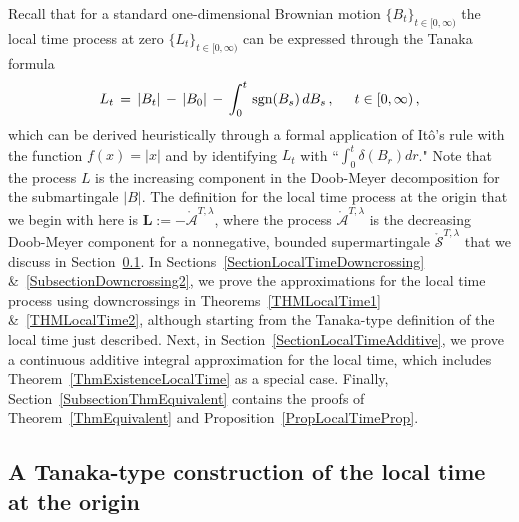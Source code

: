 \documentclass[10pt]{article}
\numberwithin{equation}{section}
\theoremstyle{definition}
\begin{document}
Recall that for a standard one-dimensional Brownian motion $\{B_t\}_{t\in [0,\infty)}$ the local time process at zero $\{L_t\}_{t\in [0,\infty)}$ can be expressed through the Tanaka formula
\begin{align*}
    L_t\,=\,|B_t|\,-\,|B_0|\,-\,\int_0^t\,\textup{sgn}(B_s)\,dB_s\,,\hspace{.5cm}t\in [0,\infty)\,,
\end{align*}
which can be derived heuristically  through a formal application of It\^o's rule with the function $f(x)=|x|$ and by identifying $L_t$ with ``$ \int_0^t\delta (B_r)dr$." Note that the process $  L$ is the increasing component in the Doob-Meyer decomposition for the submartingale $|B|$.  The definition for the local time process at the origin that we  begin with here is $\mathbf{L}:=-\mathring{\mathcal{A}}^{T,\lambda}$, where the process $\mathring{\mathcal{A}}^{T,\lambda}$ is the decreasing Doob-Meyer component for a nonnegative, bounded supermartingale  $\mathring{\mathcal{S}}^{T,\lambda}$ that we discuss in Section~\ref{SubsectionTanaka}.  In Sections~\ref{SectionLocalTimeDowncrossing} \&~\ref{SubsectionDowncrossing2}, we prove the approximations for the local time process using downcrossings in Theorems~\ref{THMLocalTime1} \&~\ref{THMLocalTime2},  although starting from  the Tanaka-type definition of the local time just described.  Next, in Section~\ref{SectionLocalTimeAdditive}, we prove a continuous additive integral approximation for the local time, which includes Theorem~\ref{ThmExistenceLocalTime} as a special case.  Finally, Section~\ref{SubsectionThmEquivalent} contains the proofs of 
 Theorem~\ref{ThmEquivalent} and Proposition~\ref{PropLocalTimeProp}.



\subsection{A Tanaka-type construction of the local time at the origin}\label{SubsectionTanaka}
\end{document}
